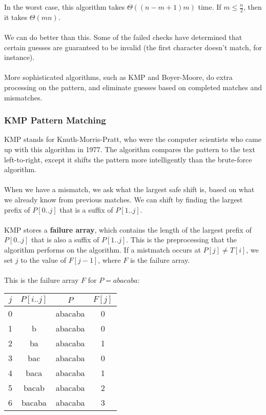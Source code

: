 \documentclass[]{article}
\theoremstyle{definition}
\begin{document}
				In the worst case, this algorithm takes $\Theta((n - m + 1)m)$ time. If $m \le \frac{n}{2}$, then it takes $\Theta(mn)$.
				\\ \\
				We can do better than this. Some of the failed checks have determined that certain guesses are guaranteed to be invalid (the first character doesn't match, for instance).
				\\ \\
				More sophisticated algorithms, such as KMP and Boyer-Moore, do extra processing on the pattern, and eliminate guesses based on completed matches and mismatches.
			\subsubsection{KMP Pattern Matching}
				KMP stands for Knuth-Morris-Pratt, who were the computer scientists who came up with this algorithm in 1977. The algorithm compares the pattern to the text left-to-right, except it shifts the pattern more intelligently than the brute-force algorithm.
				\\ \\
				When we have a mismatch, we ask what the largest safe shift is, based on what we already know from previous matches. We can shift by finding the largest prefix of $P[0..j]$ that is a suffix of $P[1..j]$.
				\\ \\
				KMP stores a \textbf{failure array}, which contains the length of the largest prefix of $P[0..j]$ that is also a suffix of $P[1..j]$. This is the preprocessing that the algorithm performs on the algorithm. If a mistmatch occurs at $P[j] \ne T[i]$, we set $j$ to the value of $F[j - 1]$, where $F$ is the failure array.
				\\ \\
				This is the failure array $F$ for $P = abacaba$:
				\begin{center}
					\begin{tabular}{|c|c|c|c|}
						\hline
						$j$ & $P[i..j]$ & $P$ & $F[j]$ \\ \hline
						0 & & abacaba & 0 \\
						1 & b & abacaba & 0 \\
						2 & ba & abacaba & 1 \\
						3 & bac & abacaba & 0 \\
						4 & baca & abacaba & 1 \\
						5 & bacab & abacaba & 2 \\
						6 & bacaba & abacaba & 3 \\ \hline
					\end{tabular}
				\end{center}
\end{document}
